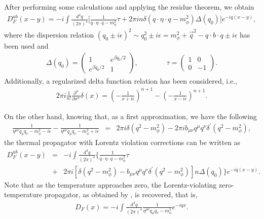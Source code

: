 \documentclass[11pt,showpacs,preprintnumbers,amsmath,amssymb,prd,nofootinbib,superscriptaddress]{revtex4-2}
\begin{document}
After performing some calculations and applying the residue theorem, we obtain
\begin{eqnarray}
    D_F^{ab}(x-y)=-i\int \frac{d^4q}{(2\pi)^4}\biggl[\frac{1}{q\cdot\eta\cdot q-m_{\phi}^2}\tau+2\pi i n\delta(q\cdot\eta\cdot q-m_{\phi}^2)\Delta(q_0)\biggr]e^{-iq(x-y)},
\end{eqnarray}
where the dispersion relation $(q_0\pm i\epsilon)^2\sim q_0^2\pm i\epsilon=m_\phi^2+\Vec{q}^2-q\cdot b\cdot q\pm i \epsilon$ has been used and 
\begin{eqnarray}
    \Delta(q_0)=\begin{pmatrix}
        1 & e^{\beta q_0/2}\\ e^{\beta q_0/2} & 1
    \end{pmatrix},\quad\quad\quad\quad \tau=\begin{pmatrix}
        1 & 0\\0 &-1
    \end{pmatrix}.
\end{eqnarray}
Additionally, a regularized delta function relation \cite{regdelta} has been considered, i.e.,
\begin{eqnarray}
    2\pi i\frac{1}{n!}\frac{\partial^n}{\partial x^n}\delta(x)=\left(-\frac{1}{x+i\epsilon}\right)^{n+1}-\left(-\frac{1}{x-i\epsilon}\right)^{n+1}.
\end{eqnarray}

On the other hand, knowing that, as a first approximation, we have the following
\begin{eqnarray}
    \frac{1}{\eta^{\mu\nu}q_{\mu}q_{\nu}-m_{\phi}^2-i\epsilon}-\frac{1}{\eta^{\mu\nu}q_{\mu}q_{\nu}-m_{\phi}^2+i\epsilon}&=&2\pi i \delta(q^2-m_\phi^2)-2\pi i b_{\mu\nu}q^\mu q^\nu\delta^{\prime}(q^2-m_{\phi}^2),\label{eq09}
\end{eqnarray}
the thermal propagator with Lorentz violation corrections can be written as
\begin{eqnarray}
     D_F^{ab}(x-y)&=&-i\int \frac{d^4q}{(2\pi)^4}\biggl\{\frac{1}{q\cdot\eta\cdot q-m_{\phi}^2}\tau\nonumber\\
     &+&2\pi i\left[\delta(q^2-m_\phi^2)- b_{\mu\nu}q^{\mu}q^{\nu} \delta^{\prime}(q^2-m_{\phi}^2)\right] n\Delta(q_0)\biggr\}e^{-iq(x-y)}.
\end{eqnarray}
Note that as the temperature approaches zero, the Lorentz-violating zero-temperature propagator, as obtained by \cite{altschul}, is recovered, that is,\begin{eqnarray}
    D_F(x)=-i\int\frac{d^4q}{(2\pi)^4}\frac{1}{\eta^{\mu\nu}q_{\mu}q_\nu-m_{\phi}^2}e^{-iqx}.
\end{eqnarray}
\end{document}
